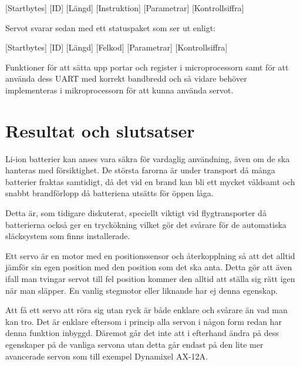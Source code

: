 \documentclass[a4paper,12pt]{article}
\begin{document}
[Startbytes] [ID] [Längd] [Instruktion] [Parametrar] [Kontrollsiffra]
 
Servot svarar sedan med ett statuspaket som ser ut enligt:
 
[Startbytes] [ID] [Längd] [Felkod] [Parametrar] [Kontrollsiffra]
 
Funktioner för att sätta upp portar och register i microprocessorn samt för att använda dess UART med korrekt bandbredd och så vidare behöver implementeras i mikroprocessorn för att kunna använda servot. 
 
 
 
\section{Resultat och slutsatser}
Li-ion batterier kan anses vara säkra för vardaglig användning, även om de ska hanteras med försiktighet. De största farorna är under transport då många batterier fraktas samtidigt, då det vid en brand kan bli ett mycket våldsamt och snabbt brandförlopp då batteriena utsätts för öppen låga.
 
Detta är, som tidigare diskuterat, speciellt viktigt vid flygtransporter då batterierna också ger en tryckökning vilket gör det svårare för de automatiska släcksystem som finns installerade.
 
Ett servo är en motor med en positionssensor och återkopplning så att det alltid jämför sin egen position med den position som det ska anta. Detta gör att även ifall man tvingar servot till fel position kommer den alltid att ställa sig rätt igen när man släpper. En vanlig stegmotor eller liknande har ej denna egenskap. 

Att få ett servo att röra sig utan ryck är både enklare och svårare än vad man kan tro. Det är enklare eftersom i princip alla servon i någon form redan har denna funktion inbyggd. Däremot går det inte att i efterhand ändra på dess egenskaper på de vanliga servona utan detta går endast på den lite mer avancerade servon som till exempel Dynamixel AX-12A.  


\newpage
\end{document}
